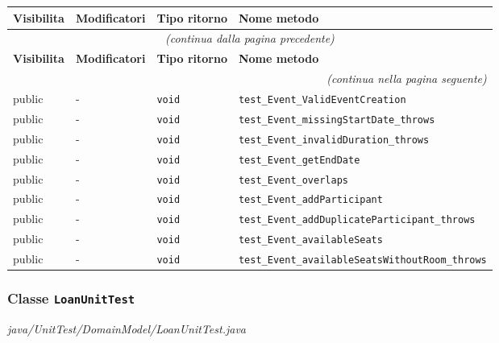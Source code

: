 \begin{longtable}{@{}llll@{}}
\toprule
\textbf{Visibilita} & \textbf{Modificatori} & \textbf{Tipo ritorno} & \textbf{Nome metodo} \\
\midrule
\endfirsthead
\multicolumn{4}{c}{\small\itshape (continua dalla pagina precedente)} \\
\toprule
\textbf{Visibilita} & \textbf{Modificatori} & \textbf{Tipo ritorno} & \textbf{Nome metodo} \\
\midrule
\endhead
\midrule
\multicolumn{4}{r}{\small\itshape (continua nella pagina seguente)} \\
\endfoot
\bottomrule
\endlastfoot
  public & - & \texttt{void} & \texttt{test\_Event\_ValidEventCreation} \\
  public & - & \texttt{void} & \texttt{test\_Event\_missingStartDate\_throws} \\
  public & - & \texttt{void} & \texttt{test\_Event\_invalidDuration\_throws} \\
  public & - & \texttt{void} & \texttt{test\_Event\_getEndDate} \\
  public & - & \texttt{void} & \texttt{test\_Event\_overlaps} \\
  public & - & \texttt{void} & \texttt{test\_Event\_addParticipant} \\
  public & - & \texttt{void} & \texttt{test\_Event\_addDuplicateParticipant\_throws} \\
  public & - & \texttt{void} & \texttt{test\_Event\_availableSeats} \\
  public & - & \texttt{void} & \texttt{test\_Event\_availableSeatsWithoutRoom\_throws} \\
\end{longtable}

\subsubsection*{Classe \texttt{LoanUnitTest}}\label{LoanUnitTest}
{\small\textit{java/UnitTest/DomainModel/LoanUnitTest.java}}
\vspace{4pt}

